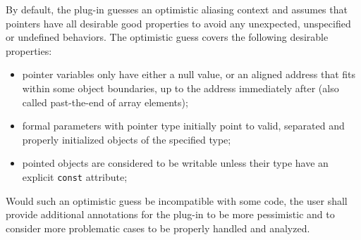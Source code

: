 By default, the \Region plug-in guesses an optimistic aliasing context
and assumes that pointers have all desirable good properties to avoid any
unexpected, unspecified or undefined behaviors. The optimistic guess covers the
following desirable properties:
\begin{itemize}
\item pointer variables only have either a null value, or an aligned
  address that fits within some object boundaries, up to the address immediately
  after (also called past-the-end of array elements);
\item formal parameters with pointer type initially point to valid, separated
  and properly initialized objects of the specified type;
\item pointed objects are considered to be writable unless their type have an
  explicit \verb+const+ attribute;
\end{itemize}
Would such an optimistic guess be incompatible with some code, the user shall
provide additional annotations for the \Region plug-in to be more
pessimistic and to consider more problematic cases to be properly handled and
analyzed.

